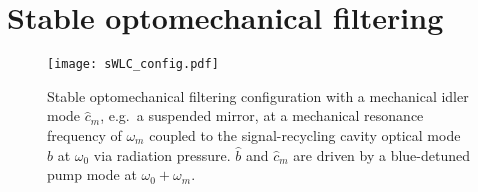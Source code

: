 \section{Stable optomechanical filtering}
\label{sec:sWLC}

\begin{figure}[ht]
	\centering
	\texttt{[image: sWLC\_config.pdf]}
	\caption{Stable optomechanical filtering configuration with a mechanical idler mode $\hat{c}_m$, e.g.\ a suspended mirror, at a mechanical resonance frequency of $\omega_m$ coupled to the signal-recycling cavity optical mode $\hat b$ at $\omega_0$ via radiation pressure. $\hat b$ and $\hat{c}_m$ are driven by a blue-detuned pump mode at $\omega_0+\omega_m$.}
	\label{fig:sWLC_config}
\end{figure}


